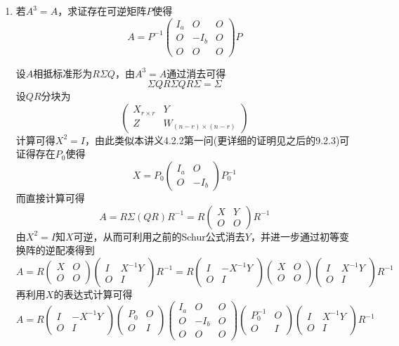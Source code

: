 \documentclass[a4paper,UTF8,fontset=windows]{ctexart}
\begin{document}
\begin{enumerate}
    \item 若$A^3=A$，求证存在可逆矩阵$P$使得
    $$A=P^{-1}\begin{pmatrix}I_a&O&O\\O&-I_b&O\\O&O&O\end{pmatrix}P$$

    设$A$相抵标准形为$R\Sigma Q$，由$A^3=A$通过消去可得
    $$\Sigma QR\Sigma QR\Sigma=\Sigma$$
    设$QR$分块为
    $$\begin{pmatrix}X_{r\times r}&Y\\Z&W_{(n-r)\times(n-r)}\end{pmatrix}$$
    计算可得$X^2=I$，由此类似本讲义4.2.2第一问(更详细的证明见之后的9.2.3)可证得存在$P_0$使得
    $$X=P_0\begin{pmatrix}I_a&O\\O&-I_b\end{pmatrix}P_0^{-1}$$
    而直接计算可得
    $$A=R\Sigma(QR)R^{-1}=R\begin{pmatrix}X&Y\\O&O\end{pmatrix}R^{-1}$$
    由$X^2=I$知$X$可逆，从而可利用之前的Schur公式消去$Y$，并进一步通过初等变换阵的逆配凑得到
    $$A=R\begin{pmatrix}X&O\\O&O\end{pmatrix}\begin{pmatrix}I&X^{-1}Y\\O&I\end{pmatrix}R^{-1}=R\begin{pmatrix}I&-X^{-1}Y\\O&I\end{pmatrix}\begin{pmatrix}X&O\\O&O\end{pmatrix}\begin{pmatrix}I&X^{-1}Y\\O&I\end{pmatrix}R^{-1}$$
    再利用$X$的表达式计算可得
    $$A=R\begin{pmatrix}I&-X^{-1}Y\\O&I\end{pmatrix}\begin{pmatrix}P_0&O\\O&I\end{pmatrix}\begin{pmatrix}I_a&O&O\\O&-I_b&O\\O&O&O\end{pmatrix}\begin{pmatrix}P_0^{-1}&O\\O&I\end{pmatrix}\begin{pmatrix}I&X^{-1}Y\\O&I\end{pmatrix}R^{-1}$$

\end{enumerate}
\end{document}
